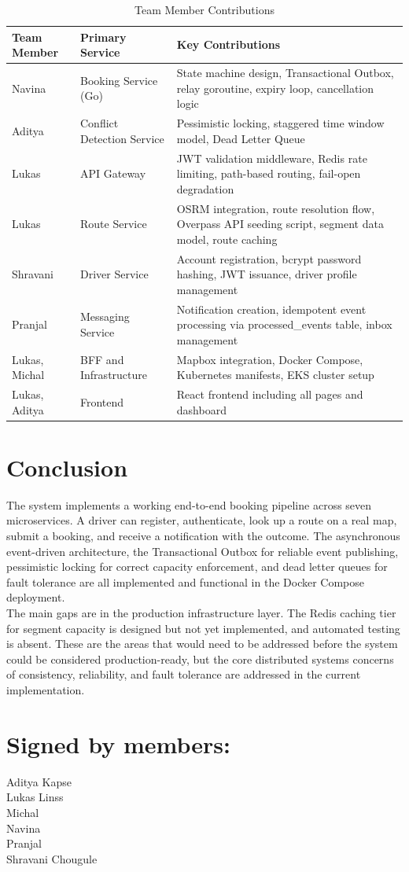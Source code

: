 \documentclass{article}
\begin{document}
\begin{table}[H]
\centering
\begin{tabular}{|p{3.5cm}|p{4cm}|p{7.5cm}|}
\hline
\textbf{Team Member} & \textbf{Primary Service} & \textbf{Key Contributions} \\
\hline
Navina & Booking Service (Go) & State machine design, Transactional Outbox, relay goroutine, expiry loop, cancellation logic \\
\hline
Aditya & Conflict Detection Service & Pessimistic locking, staggered time window model, Dead Letter Queue \\
\hline
Lukas & API Gateway & JWT validation middleware, Redis rate limiting, path-based routing, fail-open degradation \\
\hline
Lukas & Route Service & OSRM integration, route resolution flow, Overpass API seeding script, segment data model, route caching \\
\hline
Shravani & Driver Service & Account registration, bcrypt password hashing, JWT issuance, driver profile management \\
\hline
Pranjal & Messaging Service & Notification creation, idempotent event processing via processed\_events table, inbox management \\
\hline
Lukas, Michal & BFF and Infrastructure & Mapbox integration, Docker Compose, Kubernetes manifests, EKS cluster setup \\
\hline
Lukas, Aditya & Frontend & React frontend including all pages and dashboard \\
\hline
\end{tabular}
\caption{Team Member Contributions}
\label{tab:team_contributions}
\end{table}

\section{Conclusion}
The system implements a working end-to-end booking pipeline across seven microservices. A driver can register, authenticate, look up a route on a real map, submit a booking, and receive a notification with the outcome. The asynchronous event-driven architecture, the Transactional Outbox for reliable event publishing, pessimistic locking for correct capacity enforcement, and dead letter queues for fault tolerance are all implemented and functional in the Docker Compose deployment.\\
The main gaps are in the production infrastructure layer. The Redis caching tier for segment capacity is designed but not yet implemented, and automated testing is absent. These are the areas that would need to be addressed before the system could be considered production-ready, but the core distributed systems concerns of consistency, reliability, and fault tolerance are addressed in the current implementation.

\section{Signed by members:}
Aditya Kapse\\
Lukas Linss\\
Michal\\
Navina\\
Pranjal\\
Shravani Chougule
\end{document}
